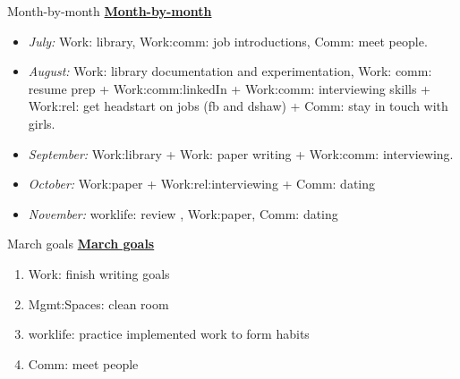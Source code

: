 \begin{columns}
\begin{column}{0.333\columnwidth}
\begin{columns}
\begin{column}{0.5\linewidth}
\ifdefined\POSTER  
    \begin{block}{Month-by-month}
\else
\underline{\bf Month-by-month} 
\fi 
      \begin{itemize} 
      \item \small \textit{July:} Work: library, Work:comm: job
        introductions, Comm: meet people.
      \item \small \textit{August:} Work: library documentation and
        experimentation, Work: comm: resume prep + Work:comm:linkedIn
        + Work:comm: interviewing skills + Work:rel: get headstart on
        jobs (fb and dshaw) + Comm: stay in touch with girls. 
      \item \small \textit{September:} Work:library + Work: paper
        writing + Work:comm: interviewing. 
      \item \small \textit{October:} Work:paper +
        Work:rel:interviewing + Comm: dating 
      \item \small \textit{November:} worklife: review , Work:paper, Comm: dating 

      \end{itemize}
\ifdefined\POSTER 
    \end{block}
\fi

\ifdefined\POSTER
\begin{block}{March goals}
\else
\underline{\bf March goals}\\
\fi 

\begin{enumerate} 
\item \small Work: finish writing goals
  \small \item \small Mgmt:Spaces: clean room 
\item \small worklife: practice implemented work to form habits 
\item \small Comm: meet people 
\end{enumerate}
\ifdefined\POSTER
\end{block}
\fi


\end{column}
\end{columns}
\end{column}
\end{columns}
